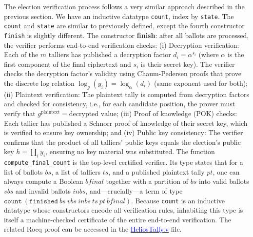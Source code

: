 \documentclass[sigconf,anonymous,review]{acmart}
\begin{document}
The election verification process follows a very similar approach described in the 
previous section. We have an inductive datatype \texttt{count}, index by \texttt{state}. 
The \texttt{count} and \texttt{state} are similar to previously defined, except the fourth constructor \texttt{finish} is 
slightly different. The constructor \textbf{finish}: after all ballots are processed, the verifier performs end-to-end 
verification checks: (i) Decryption verification: Each of the $m$ talliers has published a decryption factor $d_i = \alpha^{s_i}$ 
(where $\alpha$ is the first component of the final ciphertext and $s_i$ is their secret key). The verifier 
checks the decryption factor's validity using Chaum-Pedersen proofs that prove the discrete log relation 
$\log_g(y_i) = \log_\alpha(d_i)$ (same exponent used for both); (ii) Plaintext verification: The plaintext tally is computed from decryption factors and checked for 
consistency, i.e., for each candidate position, the prover must verify that $g^{\text{plaintext}} = \text{decrypted value}$; (iii) Proof of knowledge (POK) checks: Each tallier has published a Schnorr proof of knowledge of their 
secret key, which is verified to ensure key ownership; and (iv) Public key consistency: The verifier confirms that the product of all talliers' public keys equals 
the election's public key $h = \prod_i y_i$, ensuring no key material was substituted.  The function \texttt{compute\_final\_count} is the top-level certified
verifier. Its type states that for a list of ballots $\mathit{bs}$,
a list of talliers $\mathit{ts}$, and a published plaintext
tally $\mathit{pt}$, one can always compute a Boolean $\mathit{bfinal}$ together
with a partition of $\mathit{bs}$ into valid ballots $\mathit{vbs}$ and invalid
ballots $\mathit{inbs}$, and---crucially---a term of type
$\texttt{count}~(\texttt{finished}~\mathit{bs}~\mathit{vbs}~\mathit{inbs}~\mathit{ts}~\mathit{pt}~\mathit{bfinal})$.
Because \texttt{count} is an inductive datatype whose constructors encode all
verification rules, inhabiting this type is itself a machine-checked
certificate of the entire end-to-end verification. The related Rocq proof can be accessed in the \href{https://anonymous.4open.science/r/SigmaProtocol-EBA5/src/Backend/HeliosTally.v}{\textcolor{blue}{HeliosTally.v}} file.
\end{document}
